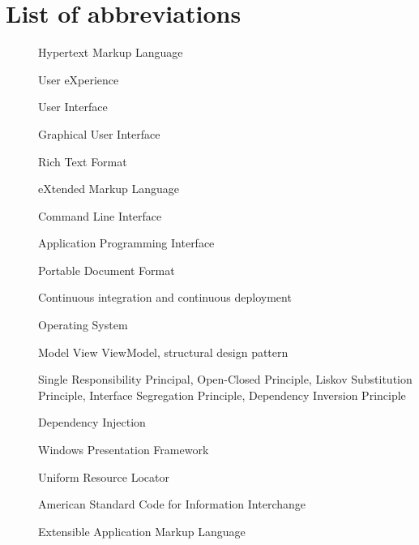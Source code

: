 \chapter*{List of abbreviations}

\begin{multicols}{2}
    \raggedright
    \begin{description}
        \item [] Hypertext Markup Language
        \item [] User eXperience
        \item [] User Interface
        \item [] Graphical User Interface
        \item [] Rich Text Format
        \item [] eXtended Markup Language
        \item [] Command Line Interface
        \item [] Application Programming Interface
        \item [] Portable Document Format
        \item [] Continuous integration and continuous deployment
        \item [] Operating System
        \item [] Model View ViewModel, structural design pattern
        \item [] Single Responsibility Principal, Open-Closed Principle, Liskov Substitution Principle, Interface Segregation Principle, Dependency Inversion Principle
        \item [] Dependency Injection
        \item [] Windows Presentation Framework
        \item [] Uniform Resource Locator
        \item [] American Standard Code for Information Interchange
        \item [] Extensible Application Markup Language
    \end{description}
\end{multicols}

